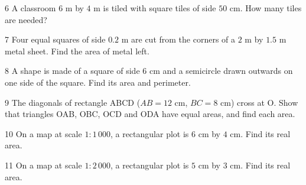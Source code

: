 \gap
\begin{probbox}{6}{\relax}
A classroom $6$ m by $4$ m is tiled with square tiles of side $50$ cm. How many tiles are needed?
\end{probbox}
\gap
\begin{probbox}{7}{\relax}
Four equal squares of side $0.2$ m are cut from the corners of a $2$ m by $1.5$ m metal sheet. Find the area of metal left.
\end{probbox}
\gap
\begin{probbox}{8}{\relax}
A shape is made of a square of side $6$ cm and a semicircle drawn outwards on one side of the square. Find its area and perimeter.
\end{probbox}
\gap
\begin{probbox}{9}{\relax}
The diagonals of rectangle ABCD ($AB=12$ cm, $BC=8$ cm) cross at O. Show that triangles OAB, OBC, OCD and ODA have equal areas, and find each area.
\end{probbox}
\gap
\begin{probbox}{10}{\relax}
On a map at scale $1:1\,000$, a rectangular plot is $6$ cm by $4$ cm. Find its real area.
\end{probbox}
\gap
\begin{probbox}{11}{\relax}
On a map at scale $1:2\,000$, a rectangular plot is $5$ cm by $3$ cm. Find its real area.
\end{probbox}
